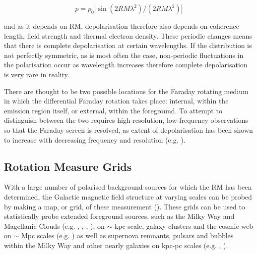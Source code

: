 \begin{equation}
    p = p_0 |\sin(2 RM \lambda^2)/(2RM\lambda^2)|
    \label{eq: Faraday depolarisation}
\end{equation}

\noindent and as it depends on RM, depolarisation therefore also depends on coherence length, field strength and thermal electron density. These periodic changes means that there is complete depolarisation at certain wavelengths. If the distribution is not perfectly symmetric, as is most often the case, non-periodic fluctuations in the polarisation occur as wavelength increases therefore complete depolarisation is very rare in reality.

There are thought to be two possible locations for the Faraday rotating medium in which the differential Faraday rotation takes place: internal, within the emission region itself, or external, within the foreground. To attempt to distinguish between the two requires high-resolution, low-frequency observations so that the Faraday screen is resolved, as extent of depolarisation has been shown to increase with decreasing frequency and resolution (e.g. \cite{cygnus_A}).

\subsection{Rotation Measure Grids}

With a large number of polarised background sources for which the RM has been determined, the Galactic magnetic field structure at varying scales can be probed by making a map, or grid, of these measurement (\cite{Johnston_2015}). These grids can be used to statistically probe extended foreground sources, such as the Milky Way and Magellanic Clouds (e.g. \cite{1980ApJ...242...74S}, \cite{1997A&A...322...98H}, \cite{Brown_2003}, \cite{Haverkorn_2006}), on $\sim$ kpc scale, galaxy clusters and the cosmic web on $\sim$ Mpc scales (e.g. \cite{Akahori_2014}) as well as supernova remnants, pulsars and bubbles within the Milky Way and other nearly galaxies on kpc-pc scales (e.g. \cite{1984ApJ...287..295M}, \cite{Gaensler_2001}). 


